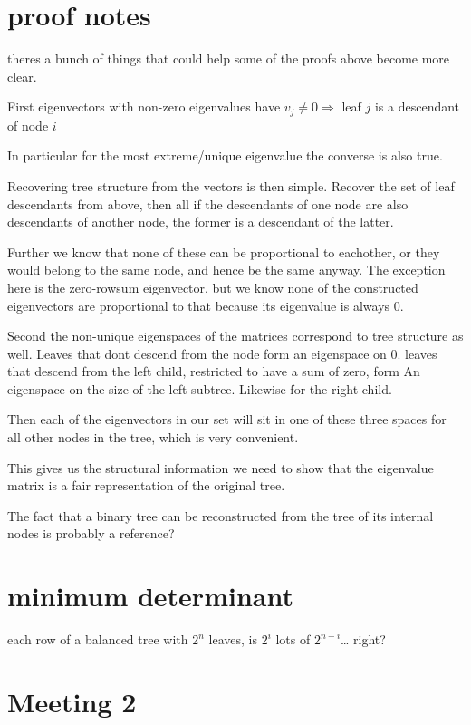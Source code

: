 \documentclass[10pt,a4paper]{report}
\begin{document}
\section{proof notes}

theres a bunch of things that could help some of the proofs above become more
clear.

First eigenvectors with non-zero eigenvalues have $v_{j} \neq 0 \Rightarrow$
leaf $j$ is a descendant of node $i$

In particular for the most extreme/unique eigenvalue the converse is also true.

Recovering tree structure from the vectors is then simple.
Recover the set of leaf descendants from above, then all if the descendants of
one node are also descendants of another node, the former is a descendant of
the latter.

Further we know that none of these can be proportional to eachother, or they
would belong to the same node, and hence be the same anyway.
The exception here is the zero-rowsum eigenvector, but we know none of the
constructed eigenvectors are proportional to that because its eigenvalue is
always 0.

Second the non-unique eigenspaces of the matrices correspond to tree structure
as well.
Leaves that dont descend from the node form an eigenspace on 0.
leaves that descend from the left child, restricted to have a sum of zero, form
An eigenspace on the size of the left subtree.
Likewise for the right child.

Then each of the eigenvectors in our set will sit in one of these three spaces
for all other nodes in the tree, which is very convenient.

This gives us the structural information we need to show that the eigenvalue
matrix is a fair representation of the original tree.

The fact that a binary tree can be reconstructed from the tree of its internal
nodes is probably a reference?

\section{minimum determinant}

each row of a balanced tree with $2^n$ leaves, is $2^i$ lots of $2^{n-i}$\ldots
right?

\section{Meeting 2}
\end{document}
